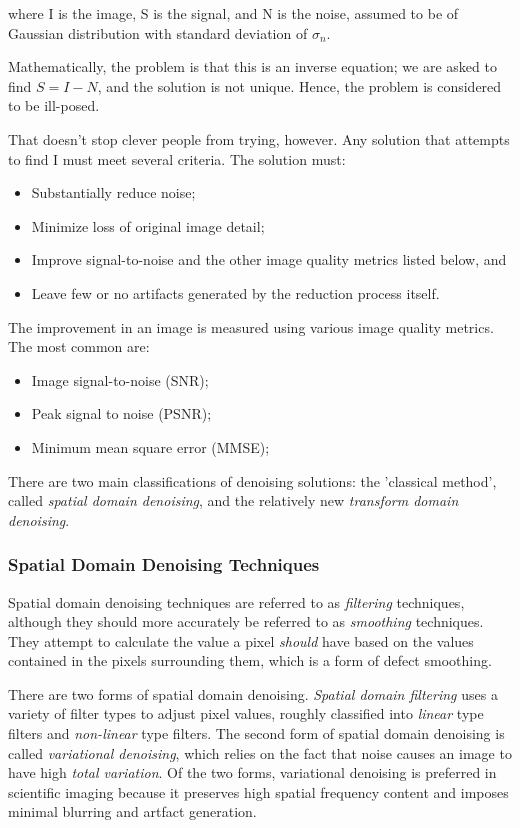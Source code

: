 \documentclass[10pt]{article}
\begin{document}
\noindent where I is the image, S is the signal, and N is the noise, assumed to be of Gaussian distribution with standard deviation of $\sigma_n$. 

Mathematically, the problem is that this is an inverse equation; we are asked to find $S = I - N$, and the solution is not unique. Hence, the problem is considered to be ill-posed.

That doesn't stop clever people from trying, however. Any solution that attempts to find I must meet several criteria. The solution must:

\begin{itemize}[noitemsep]
    \item Substantially reduce noise;
    \item Minimize loss of original image detail;
    \item Improve signal-to-noise and the other image quality metrics listed below, and
    \item Leave few or no artifacts generated by the reduction process itself.
\end{itemize}

\noindent The improvement in an image is measured using various image quality metrics. The most common are:

\begin{itemize}[noitemsep]
    \item Image signal-to-noise (SNR);
    \item Peak signal to noise (PSNR);
    \item Minimum mean square error (MMSE);
\end{itemize}

There are two main classifications of denoising solutions: the 'classical method', called \emph{spatial domain denoising}, and the relatively new \emph{transform domain denoising}.

\subsubsection{Spatial Domain Denoising Techniques}

Spatial domain denoising techniques are referred to as \emph{filtering} techniques, although they should more accurately be referred to as \emph{smoothing} techniques. They attempt to calculate the value a pixel \emph{should} have based on the values contained in the pixels surrounding them, which is a form of defect smoothing. 

There are two forms of spatial domain denoising. \emph{Spatial domain filtering} uses a variety of filter types to adjust pixel values, roughly classified into \emph{linear} type filters and \emph{non-linear} type filters. The second form of spatial domain denoising is called \emph{variational denoising}, which relies on the fact that noise causes an image to have high \emph{total variation}. Of the two forms, variational denoising is preferred in scientific imaging because it preserves high spatial frequency content and imposes minimal blurring and artfact generation.
\end{document}
